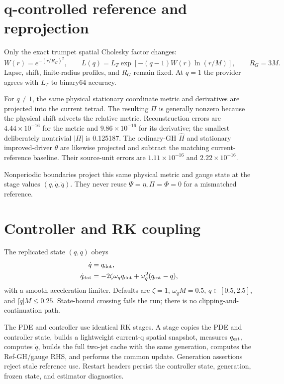 \documentclass[10pt]{article}
\begin{document}
\section{q-controlled reference and reprojection}

Only the exact trumpet spatial Cholesky factor changes:
\begin{equation}
W(r)=e^{-(r/R_G)^2},\qquad
L(q)=L_T\exp[-(q-1)W(r)\ln(r/M)],\qquad R_G=3M.
\end{equation}
Lapse, shift, finite-radius profiles, and $R_G$ remain fixed.  At $q=1$ the
provider agrees with $L_T$ to binary64 accuracy.

For $q\ne1$, the same physical stationary coordinate metric and derivatives
are projected into the current tetrad.  The resulting $\Pi$ is generally
nonzero because the physical shift advects the relative metric.  Reconstruction
errors are $4.44\times10^{-16}$ for the metric and
$9.86\times10^{-16}$ for its derivative; the smallest deliberately nontrivial
$|\Pi|$ is 0.125187.  The ordinary-GH $\hat H$ and stationary improved-driver
$\theta$ are likewise projected and subtract the matching current-reference
baseline.  Their source-unit errors are $1.11\times10^{-16}$ and
$2.22\times10^{-16}$.

Nonperiodic boundaries project this same physical metric and gauge state at
the stage values $(q,\dot q,\ddot q)$.  They never reuse
$\Psi=\eta,\Pi=\Phi=0$ for a mismatched reference.

\section{Controller and RK coupling}

The replicated state $(q,\dot q)$ obeys
\begin{align}
\dot q &= q_{\rm dot},\\
\dot q_{\rm dot} &= -2\zeta\omega_q q_{\rm dot}
                    +\omega_q^2(q_{\rm est}-q),
\end{align}
with a smooth acceleration limiter.  Defaults are $\zeta=1$,
$\omega_qM=0.5$, $q\in[0.5,2.5]$, and $|\dot q|M\leq0.25$.  State-bound
crossing fails the run; there is no clipping-and-continuation path.

The PDE and controller use identical RK stages.  A stage copies the PDE and
controller state, builds a lightweight current-q spatial snapshot, measures
$q_{\rm est}$, computes $\ddot q$, builds the full two-jet cache with the same
generation, computes the Ref-GH/gauge RHS, and performs the common update.
Generation assertions reject stale reference use.  Restart headers persist the
controller state, generation, frozen state, and estimator diagnostics.
\end{document}
